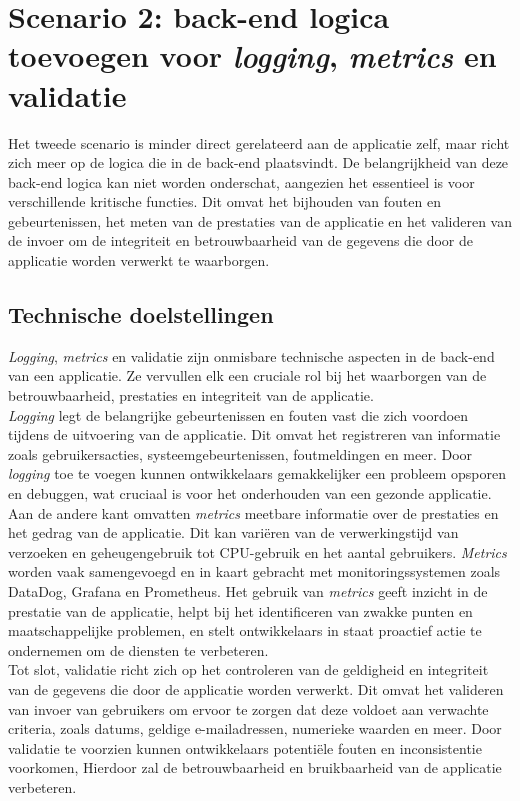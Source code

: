\section{Scenario 2: back-end logica toevoegen voor \textit{logging}, \textit{metrics} en validatie}

Het tweede scenario is minder direct gerelateerd aan de applicatie zelf, maar richt zich meer op de logica die in de back-end plaatsvindt. De belangrijkheid van deze back-end logica kan niet worden onderschat, aangezien het essentieel is voor verschillende kritische functies. Dit omvat het bijhouden van fouten en gebeurtenissen, het meten van de prestaties van de applicatie en het valideren van de invoer om de integriteit en betrouwbaarheid van de gegevens die door de applicatie worden verwerkt te waarborgen.

\subsection{Technische doelstellingen}

\textit{Logging}, \textit{metrics} en validatie zijn onmisbare technische aspecten in de back-end van een applicatie. Ze vervullen elk een cruciale rol bij het waarborgen van de betrouwbaarheid, prestaties en integriteit van de applicatie.
 \\
\textit{Logging} legt de belangrijke gebeurtenissen en fouten vast die zich voordoen tijdens de uitvoering van de applicatie. Dit omvat het registreren van informatie zoals gebruikersacties, systeemgebeurtenissen, foutmeldingen en meer. Door \textit{logging} toe te voegen kunnen ontwikkelaars gemakkelijker een probleem opsporen en debuggen, wat cruciaal is voor het onderhouden van een gezonde applicatie. 
 \\
Aan de andere kant omvatten \textit{metrics} meetbare informatie over de prestaties en het gedrag van de applicatie. Dit kan variëren van de verwerkingstijd van verzoeken en geheugengebruik tot CPU-gebruik en het aantal gebruikers. \textit{Metrics} worden vaak samengevoegd en in kaart gebracht met monitoringssystemen zoals DataDog, Grafana en Prometheus. Het gebruik van \textit{metrics} geeft inzicht in de prestatie van de applicatie, helpt bij het identificeren van zwakke punten en maatschappelijke problemen, en stelt ontwikkelaars in staat proactief actie te ondernemen om de diensten te verbeteren. 
 \\
Tot slot, validatie richt zich op het controleren van de geldigheid en integriteit van de gegevens die door de applicatie worden verwerkt. Dit omvat het valideren van invoer van gebruikers om ervoor te zorgen dat deze voldoet aan verwachte criteria, zoals datums, geldige e-mailadressen, numerieke waarden en meer. Door validatie te voorzien kunnen ontwikkelaars potentiële fouten en inconsistentie voorkomen, Hierdoor zal de betrouwbaarheid en bruikbaarheid van de applicatie verbeteren.


